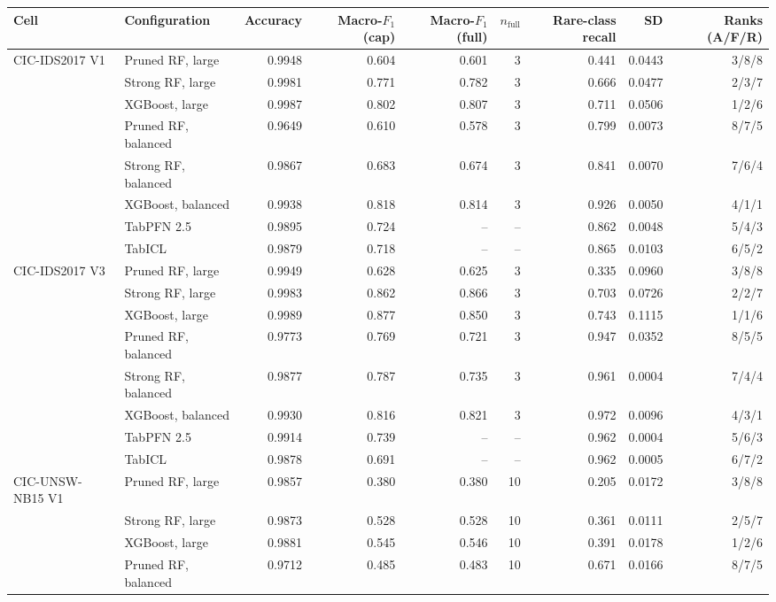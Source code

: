 \begin{tabular}{@{}llrrrrrrr@{}}
\toprule
Cell & Configuration & Accuracy & Macro-$F_1$ (cap) & Macro-$F_1$ (full) & $n_{\mathrm{full}}$ & Rare-class recall & SD & Ranks (A/F/R) \\
\midrule
CIC-IDS2017 V1 & Pruned RF, large & 0.9948 & 0.604 & 0.601 & 3 & 0.441 & 0.0443 & 3/8/8 \\
 & Strong RF, large & 0.9981 & 0.771 & 0.782 & 3 & 0.666 & 0.0477 & 2/3/7 \\
 & XGBoost, large & 0.9987 & 0.802 & 0.807 & 3 & 0.711 & 0.0506 & 1/2/6 \\
 & Pruned RF, balanced & 0.9649 & 0.610 & 0.578 & 3 & 0.799 & 0.0073 & 8/7/5 \\
 & Strong RF, balanced & 0.9867 & 0.683 & 0.674 & 3 & 0.841 & 0.0070 & 7/6/4 \\
 & XGBoost, balanced & 0.9938 & 0.818 & 0.814 & 3 & 0.926 & 0.0050 & 4/1/1 \\
 & TabPFN 2.5 & 0.9895 & 0.724 & -- & -- & 0.862 & 0.0048 & 5/4/3 \\
 & TabICL & 0.9879 & 0.718 & -- & -- & 0.865 & 0.0103 & 6/5/2 \\
\addlinespace
CIC-IDS2017 V3 & Pruned RF, large & 0.9949 & 0.628 & 0.625 & 3 & 0.335 & 0.0960 & 3/8/8 \\
 & Strong RF, large & 0.9983 & 0.862 & 0.866 & 3 & 0.703 & 0.0726 & 2/2/7 \\
 & XGBoost, large & 0.9989 & 0.877 & 0.850 & 3 & 0.743 & 0.1115 & 1/1/6 \\
 & Pruned RF, balanced & 0.9773 & 0.769 & 0.721 & 3 & 0.947 & 0.0352 & 8/5/5 \\
 & Strong RF, balanced & 0.9877 & 0.787 & 0.735 & 3 & 0.961 & 0.0004 & 7/4/4 \\
 & XGBoost, balanced & 0.9930 & 0.816 & 0.821 & 3 & 0.972 & 0.0096 & 4/3/1 \\
 & TabPFN 2.5 & 0.9914 & 0.739 & -- & -- & 0.962 & 0.0004 & 5/6/3 \\
 & TabICL & 0.9878 & 0.691 & -- & -- & 0.962 & 0.0005 & 6/7/2 \\
\addlinespace
CIC-UNSW-NB15 V1 & Pruned RF, large & 0.9857 & 0.380 & 0.380 & 10 & 0.205 & 0.0172 & 3/8/8 \\
 & Strong RF, large & 0.9873 & 0.528 & 0.528 & 10 & 0.361 & 0.0111 & 2/5/7 \\
 & XGBoost, large & 0.9881 & 0.545 & 0.546 & 10 & 0.391 & 0.0178 & 1/2/6 \\
 & Pruned RF, balanced & 0.9712 & 0.485 & 0.483 & 10 & 0.671 & 0.0166 & 8/7/5 \\

\end{tabular}
